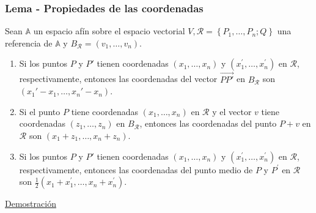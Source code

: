 \documentclass[12pt, a4paper, ones, notitlepage, openany,titlepage]{article}
\newcommand{\demostracion}{\noindent\underline{Demostración}}
\begin{document}
\subsubsection{Lema - Propiedades de las coordenadas}
Sean $\mathbb{A}$ un espacio afín sobre el espacio vectorial $V, \mathcal{R}=\left\{P_{1}, \ldots, P_{n} ; Q\right\}$ una referencia de $\mathbb{A}$ y $B_{\mathcal{R}}=\left(v_{1}, \ldots, v_{n}\right)$.
\begin{enumerate}[label=(\arabic*)]
\item Si los puntos $P$ y $P'$ tienen coordenadas $\left(x_{1}, \ldots, x_{n}\right)$ y $\left(x_{1}^{\prime}, \ldots, x_{n}^{\prime}\right)$ en $\mathcal{R}$, respectivamente, entonces las coordenadas del vector $\overrightarrow{PP'}$ en $B_\mathcal{R}$ son $(x_1'-x_1,\ldots,x_n'-x_n)$.

\item Si el punto $P$ tiene coordenadas $\left(x_{1}, \ldots, x_{n}\right)$ en $\mathcal{R}$ y el vector $v$ tiene coordenadas $\left(z_{1}, \ldots, z_{n}\right)$ en $B_{\mathcal{R}}$, entonces las coordenadas del punto $P+v$ en $\mathcal{R}$ son $\left(x_{1}+z_{1}, \ldots, x_{n}+z_{n}\right)$.

\item Si los puntos $P$ y $P'$ tienen coordenadas $\left(x_{1}, \ldots, x_{n}\right)$ y $\left(x_{1}^{\prime}, \ldots, x_{n}^{\prime}\right)$ en $\mathcal{R}$, respectivamente, entonces las coordenadas del punto medio de $P$ y $P^{\prime}$ en $\mathcal{R}$ son $\frac{1}{2}\left(x_{1}+x_{1}^{\prime}, \ldots, x_{n}+x_{n}^{\prime}\right)$.
\end{enumerate}
\demostracion
\end{document}
